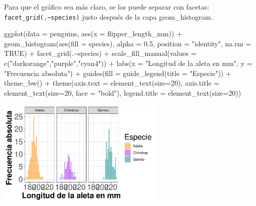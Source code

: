 \documentclass[
  letterpaper,
  DIV=11,
  numbers=noendperiod]{scrreprt}
\newenvironment{Shaded}{\begin{snugshade}}{\end{snugshade}}
\newcommand{\AttributeTok}[1]{\textcolor[rgb]{0.40,0.45,0.13}{#1}}
\newcommand{\ConstantTok}[1]{\textcolor[rgb]{0.56,0.35,0.01}{#1}}
\newcommand{\DecValTok}[1]{\textcolor[rgb]{0.68,0.00,0.00}{#1}}
\newcommand{\FloatTok}[1]{\textcolor[rgb]{0.68,0.00,0.00}{#1}}
\newcommand{\FunctionTok}[1]{\textcolor[rgb]{0.28,0.35,0.67}{#1}}
\newcommand{\NormalTok}[1]{\textcolor[rgb]{0.00,0.23,0.31}{#1}}
\newcommand{\SpecialCharTok}[1]{\textcolor[rgb]{0.37,0.37,0.37}{#1}}
\newcommand{\StringTok}[1]{\textcolor[rgb]{0.13,0.47,0.30}{#1}}
\begin{document}
Para que el gráfico sea más claro, se los puede separar con facetas:
\texttt{facet\_grid(.\textasciitilde{}species)} justo después de la capa
geom\_histogram.

\begin{Shaded}
\begin{Highlighting}[]
\FunctionTok{ggplot}\NormalTok{(}\AttributeTok{data =}\NormalTok{ penguins, }\FunctionTok{aes}\NormalTok{(}\AttributeTok{x =}\NormalTok{ flipper\_length\_mm)) }\SpecialCharTok{+}
  \FunctionTok{geom\_histogram}\NormalTok{(}\FunctionTok{aes}\NormalTok{(}\AttributeTok{fill =}\NormalTok{ species), }
                 \AttributeTok{alpha =} \FloatTok{0.5}\NormalTok{, }
                 \AttributeTok{position =} \StringTok{"identity"}\NormalTok{,}
                 \AttributeTok{na.rm =} \ConstantTok{TRUE}\NormalTok{) }\SpecialCharTok{+}
  \FunctionTok{facet\_grid}\NormalTok{(.}\SpecialCharTok{\textasciitilde{}}\NormalTok{species) }\SpecialCharTok{+}
  \FunctionTok{scale\_fill\_manual}\NormalTok{(}\AttributeTok{values =} \FunctionTok{c}\NormalTok{(}\StringTok{"darkorange"}\NormalTok{,}\StringTok{"purple"}\NormalTok{,}\StringTok{"cyan4"}\NormalTok{)) }\SpecialCharTok{+}
  \FunctionTok{labs}\NormalTok{(}\AttributeTok{x =} \StringTok{"Longitud de la aleta en mm"}\NormalTok{,}
       \AttributeTok{y =} \StringTok{"Frecuencia absoluta"}\NormalTok{) }\SpecialCharTok{+}
  \FunctionTok{guides}\NormalTok{(}\AttributeTok{fill =} \FunctionTok{guide\_legend}\NormalTok{(}\AttributeTok{title =} \StringTok{"Especie"}\NormalTok{)) }\SpecialCharTok{+}
  \FunctionTok{theme\_bw}\NormalTok{() }\SpecialCharTok{+}
  \FunctionTok{theme}\NormalTok{(}\AttributeTok{axis.text =} \FunctionTok{element\_text}\NormalTok{(}\AttributeTok{size=}\DecValTok{20}\NormalTok{),}
        \AttributeTok{axis.title =} \FunctionTok{element\_text}\NormalTok{(}\AttributeTok{size=}\DecValTok{20}\NormalTok{, }\AttributeTok{face =} \StringTok{"bold"}\NormalTok{),}
        \AttributeTok{legend.title =} \FunctionTok{element\_text}\NormalTok{(}\AttributeTok{size=}\DecValTok{20}\NormalTok{))}
\end{Highlighting}
\end{Shaded}

\begin{center}
\includegraphics[width=0.6\textwidth,height=0.6\textheight]{t1_intro_files/figure-pdf/unnamed-chunk-99-1.pdf}
\end{center}
\end{document}
